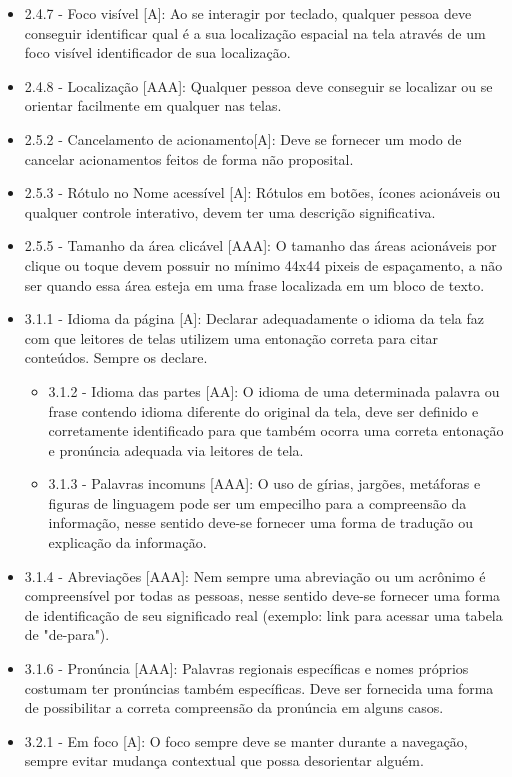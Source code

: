 {\begin{itemize}
\begin{itemize}
\end{itemize}
\item 2.4.7 - Foco visível [A]: Ao se interagir por teclado, qualquer pessoa deve conseguir identificar qual é a sua localização espacial na tela através de um foco visível identificador de sua localização.
\item 2.4.8 - Localização [AAA]: Qualquer pessoa deve conseguir se localizar ou se orientar facilmente em qualquer nas telas.
\item 2.5.2 - Cancelamento de acionamento[A]: Deve se fornecer um modo de cancelar acionamentos feitos de forma não proposital.
\item 2.5.3 - Rótulo no Nome acessível [A]: Rótulos em botões, ícones acionáveis ou qualquer controle interativo, devem ter uma descrição significativa.
\item 2.5.5 - Tamanho da área clicável [AAA]: O tamanho das áreas acionáveis por clique ou toque devem possuir no mínimo 44x44 pixeis de espaçamento, a não ser quando essa área esteja em uma frase localizada em um bloco de texto.
\item 3.1.1 - Idioma da página [A]: Declarar adequadamente o idioma da tela faz com que leitores de telas utilizem uma entonação correta para citar conteúdos. Sempre os declare.
\begin{itemize}
\item 3.1.2 - Idioma das partes [AA]: O idioma de uma determinada palavra ou frase contendo idioma diferente do original da tela, deve ser definido e corretamente identificado para que também ocorra uma correta entonação e pronúncia adequada via leitores de tela.
\item 3.1.3 - Palavras incomuns [AAA]: O uso de gírias, jargões, metáforas e figuras de linguagem pode ser um empecilho para a compreensão da informação, nesse sentido deve-se fornecer uma forma de tradução ou explicação da informação.
\end{itemize}
\item 3.1.4 - Abreviações [AAA]: Nem sempre uma abreviação ou um acrônimo é compreensível por todas as pessoas, nesse sentido deve-se fornecer uma forma de identificação de seu significado real (exemplo: link para acessar uma tabela de "de-para").
\item 3.1.6 - Pronúncia [AAA]: Palavras regionais específicas e nomes próprios costumam ter pronúncias também específicas. Deve ser fornecida uma forma de possibilitar a correta compreensão da pronúncia em alguns casos.
\item 3.2.1 - Em foco [A]: O foco sempre deve se manter durante a navegação, sempre evitar mudança contextual que possa desorientar alguém.

\end{itemize}}
